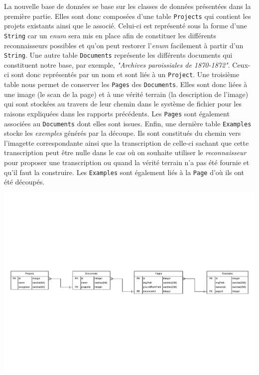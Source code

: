 La nouvelle base de données se base sur les classes de données présentées dans la première partie. Elles sont donc composées d'une table \texttt{Projects} qui contient les projets existants ainsi que le associé. Celui-ci est représenté sous la forme d'une \texttt{String} car un \textit{enum} sera mis en place afin de constituer les différents reconnaisseurs possibles et qu'on peut restorer l'\textit{enum} facilement à partir d'un \texttt{String}. Une autre table \texttt{Documents} représente les différents documents qui constituent notre base, par exemple, \textit{"Archives paroissiales de 1870-1872"}. Ceux-ci sont donc représentés par un nom et sont liés à un \texttt{Project}. Une troisième table nous permet de conserver les \texttt{Pages} des \texttt{Documents}. Elles sont donc liées à une image (le scan de la page) et à une vérité terrain (la description de l'image) qui sont stockées au travers de leur chemin dans le système de fichier pour les raisons expliquées dans les rapports précédents. Les \texttt{Pages} sont également associées au \texttt{Documents} dont elles sont issues. Enfin, une dernière table \texttt{Examples} stocke les \textit{exemples} générés par la découpe. Ils sont constitués du chemin vers l'imagette correspondante ainsi que la transcription de celle-ci sachant que cette transcription peut être nulle dans le cas où on souhaite utiliser le \textit{reconnaisseur} pour proposer une transcription ou quand la vérité terrain n'a pas été fournie et qu'il faut la construire. Les \texttt{Examples} sont également liés à la \texttt{Page} d'où ils ont été découpés.

\begin{mdframed}[frametitle={Structure de la base de données}, innerbottommargin=10]
\begin{center}
\includegraphics[scale=0.5]{assets/DatabaseEntity.pdf}
\end{center}
\end{mdframed}

